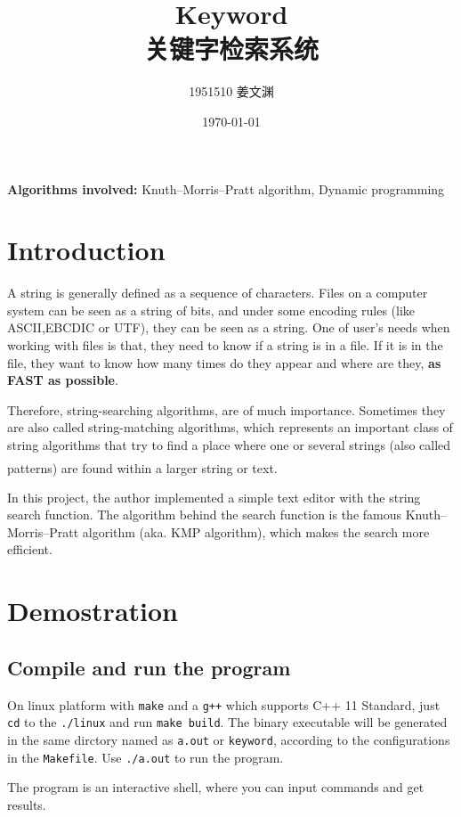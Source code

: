 \documentclass[cn,black,12pt,normal]{elegantnote}
\title{Keyword\\关键字检索系统}
\author{1951510\; 姜文渊}
\institute{\small \url{https://github.com/jwyjohn/Jwy_DataStructureHomework}}
\date{\today}
\newcommand{\uct}[1]{\textsuperscript{\textsuperscript{\cite{#1}}}}
\begin{document}
\maketitle

\textbf{Algorithms involved:} Knuth–Morris–Pratt algorithm, Dynamic programming

\tableofcontents

\section{Introduction}
A string is generally defined as a sequence of characters. Files on a computer system can be seen as a string of bits, and under some encoding rules (like  ASCII,EBCDIC or UTF), they can be seen as a string. One of user's needs when working with files is that, they need to know if a string is in a file. If it is in the file, they want to know how many times do they appear and where are they, \textbf{as FAST as possible}.

Therefore, string-searching algorithms, are of much importance. Sometimes they are also called string-matching algorithms, which represents an important class of string algorithms that try to find a place where one or several strings (also called patterns) are found within a larger string or text.\uct{wiki:String-searching_algorithm}

In this project, the author implemented a simple text editor with the string search function. The algorithm behind the search function is the famous Knuth–Morris–Pratt algorithm (aka. KMP algorithm), which makes the search more efficient.

\section{Demostration}

\subsection{Compile and run the program}

On linux platform with \lstinline{make} and a \lstinline{g++} which supports C++ 11 Standard, just \lstinline{cd} to the \lstinline{./linux} and run \lstinline{make build}. The binary executable will be generated in the same dirctory named as \lstinline{a.out} or \lstinline{keyword}, according to the configurations in the \lstinline{Makefile}. Use \lstinline{./a.out} to run the program.

The program is an interactive shell, where you can input commands and get results.
\end{document}
